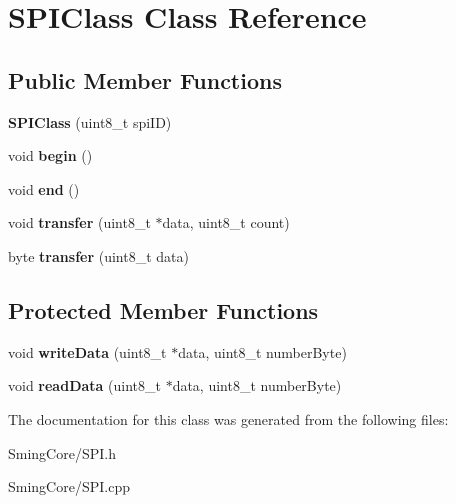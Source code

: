 \hypertarget{class_s_p_i_class}{}\section{S\+P\+I\+Class Class Reference}
\label{class_s_p_i_class}
\subsection*{Public Member Functions}
\begin{DoxyCompactItemize}
\item 
\hypertarget{class_s_p_i_class_a424cda909940ec30730a22e90764cd59}{}{\bfseries S\+P\+I\+Class} (uint8\+\_\+t spi\+I\+D)\label{class_s_p_i_class_a424cda909940ec30730a22e90764cd59}

\item 
\hypertarget{class_s_p_i_class_a4a2646959a242f6af423b04734c003f0}{}void {\bfseries begin} ()\label{class_s_p_i_class_a4a2646959a242f6af423b04734c003f0}

\item 
\hypertarget{class_s_p_i_class_a79d89d8e3f5f1b003cb7b0aed2d77eab}{}void {\bfseries end} ()\label{class_s_p_i_class_a79d89d8e3f5f1b003cb7b0aed2d77eab}

\item 
\hypertarget{class_s_p_i_class_af453faad2fe2fd9c166e6690a19f476a}{}void {\bfseries transfer} (uint8\+\_\+t $\ast$data, uint8\+\_\+t count)\label{class_s_p_i_class_af453faad2fe2fd9c166e6690a19f476a}

\item 
\hypertarget{class_s_p_i_class_a3ffa792ef92b0d1c299c9ea1185552ee}{}byte {\bfseries transfer} (uint8\+\_\+t data)\label{class_s_p_i_class_a3ffa792ef92b0d1c299c9ea1185552ee}

\end{DoxyCompactItemize}
\subsection*{Protected Member Functions}
\begin{DoxyCompactItemize}
\item 
\hypertarget{class_s_p_i_class_a26a8fb6897c7da200412428be6bb9f9a}{}void {\bfseries write\+Data} (uint8\+\_\+t $\ast$data, uint8\+\_\+t number\+Byte)\label{class_s_p_i_class_a26a8fb6897c7da200412428be6bb9f9a}

\item 
\hypertarget{class_s_p_i_class_a6a4d99e2e3b867025e71f030ff756be2}{}void {\bfseries read\+Data} (uint8\+\_\+t $\ast$data, uint8\+\_\+t number\+Byte)\label{class_s_p_i_class_a6a4d99e2e3b867025e71f030ff756be2}

\end{DoxyCompactItemize}


The documentation for this class was generated from the following files\+:\begin{DoxyCompactItemize}
\item 
Sming\+Core/S\+P\+I.\+h\item 
Sming\+Core/S\+P\+I.\+cpp\end{DoxyCompactItemize}
